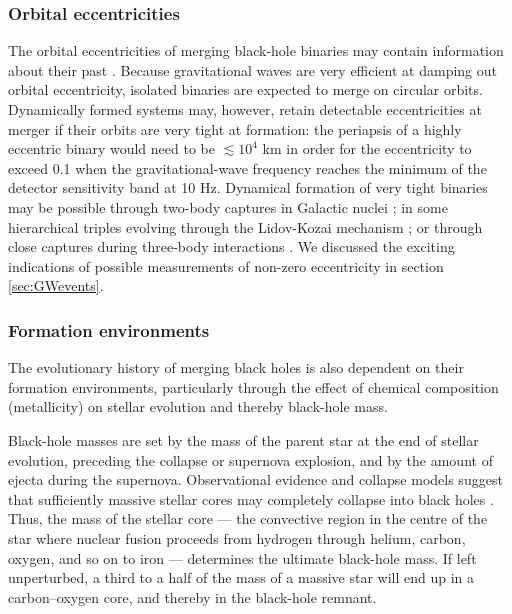 \documentclass[review]{elsarticle}
\begin{document}
\subsubsection{Orbital eccentricities}
	The orbital eccentricities of merging black-hole binaries may contain information about their past \citep{MandelOShaughnessy:2010}. Because gravitational waves are very efficient at damping out orbital eccentricity, isolated binaries are expected to merge on circular orbits. Dynamically formed systems may, however, retain detectable eccentricities at merger if their orbits are very tight at formation: the periapsis of a highly eccentric binary would need to be $\lesssim 10^4$ km in order for the eccentricity to exceed 0.1 when the gravitational-wave frequency reaches the minimum of the detector sensitivity band at 10 Hz.  Dynamical formation of very tight binaries may be possible through two-body captures in Galactic nuclei \citep[][but see \cite{Tsang:2013}]{OLeary:2008}; in some hierarchical triples evolving through the Lidov-Kozai mechanism \citep[e.g.,][]{AntoniniPerets:2012}; or through close captures during three-body interactions \citep{Samsing:2014, Rodriguez:2018}.  We discussed the exciting indications of possible measurements of non-zero eccentricity \citep{RomeroShaw:2021} in section \ref{sec:GWevents}.


\subsubsection{Formation environments}
\label{environ}
The evolutionary history of merging black holes is also dependent on their formation environments, particularly through the effect of chemical composition (metallicity) on stellar evolution and thereby black-hole mass.

Black-hole masses are set by the mass of the parent star at the end of stellar evolution, preceding the collapse or supernova explosion, and by the amount of ejecta during the supernova. Observational evidence and collapse models suggest that sufficiently massive stellar cores may completely collapse into black holes \citep[for a review, see][]{Mirabel:2016}. Thus, the mass of the stellar core --- the convective region in the centre of the star where nuclear fusion proceeds from hydrogen through helium, carbon, oxygen, and so on to iron --- determines the ultimate black-hole mass.  If left unperturbed, a third to a half of the mass of a massive star will end up in a carbon--oxygen core, and thereby in the black-hole remnant.
\end{document}
